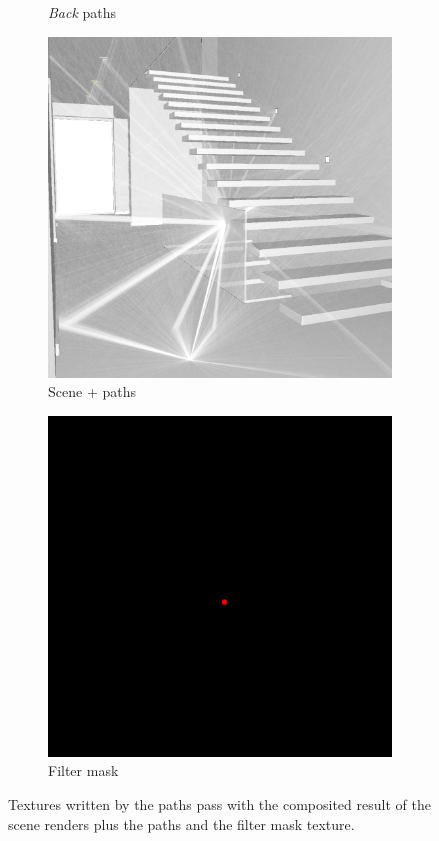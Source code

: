 \begin{figure}
\begin{subfigure}[t]{0.24\linewidth}
		\caption{\textit{Back} paths}
		\label{rays_back}
	\end{subfigure}
	\begin{subfigure}[t]{0.24\linewidth}
		\includegraphics[width=\textwidth]{chapters/chapter_thetool/beauty+rays}
		\caption{Scene + paths}
		\label{beauty+rays}
	\end{subfigure}
	\begin{subfigure}[t]{0.24\linewidth}
		\includegraphics[width=\textwidth]{chapters/chapter_thetool/filter_mask}
		\caption{Filter mask}
		\label{filter_mask}
	\end{subfigure}

	\caption{Textures written by the paths pass with the composited result of the scene renders plus the paths and the filter mask texture.}
	\label{final_passes}
\end{figure}

